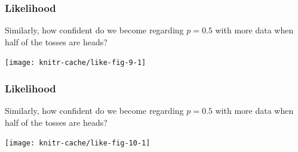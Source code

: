 
\begin{frame}
\frametitle{Likelihood}

Similarly, how confident do we become regarding $p=0.5$ with more data when half of the tosses are heads?

\begin{center}
\begin{knitrout}
\color{fgcolor}
\texttt{[image: knitr-cache/like-fig-9-1]}

\end{knitrout}
\end{center}
\end{frame}


\begin{frame}
\frametitle{Likelihood}

Similarly, how confident do we become regarding $p=0.5$ with more data when half of the tosses are heads?

\begin{center}
\begin{knitrout}
\color{fgcolor}
\texttt{[image: knitr-cache/like-fig-10-1]}

\end{knitrout}
\end{center}
\end{frame}



